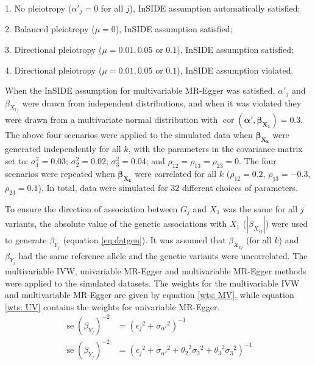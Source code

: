 \documentclass[a4paper,12pt]{article}
\DeclareMathOperator{\se}{se} %
\DeclareMathOperator{\cor}{cor}
\begin{document}
\begin{bibunit}[wileyj]
\begin{compactitem}
\item[1.] No pleiotropy ($\alpha'_{j}=0$ for all $j$), InSIDE assumption automatically satisfied;
\item[2.] Balanced pleiotropy ($\mu=0$), InSIDE assumption satisfied;
\item[3.] Directional pleiotropy ($\mu=0.01, 0.05$ or $0.1$), InSIDE assumption satisfied;
\item[4.] Directional pleiotropy ($\mu=0.01, 0.05$ or $0.1$), InSIDE assumption violated. \\
\end{compactitem}
When the InSIDE assumption for multivariable MR-Egger was satisfied, $\alpha'_{j}$ and $\beta_{X_{1j}}$ were drawn from independent distributions, and when it was violated they were drawn from a multivariate normal distribution with $\cor(\boldsymbol{\alpha'},\boldsymbol{\beta_{X_{1}}})=0.3$. The above four scenarios were applied to the simulated data when $\boldsymbol{\beta_{X_{k}}}$ were generated independently for all $k$, with the parameters in the covariance matrix set to: $\sigma_{1}^{2}=0.03$; $\sigma_{2}^{2}=0.02$; $\sigma_{3}^{2}=0.04$; and $\rho_{12}=\rho_{13}=\rho_{23}=0$. The four scenarios were repeated when $\boldsymbol{\beta_{X_{k}}}$ were correlated for all $k$ ($\rho_{12}=0.2$, $\rho_{13}=-0.3$, $\rho_{23}=0.1$). In total, data were simulated for 32 different choices of parameters.  

To ensure the direction of association between $G_{j}$ and $X_{1}$ was the same for all $j$ variants, the absolute value of the genetic associations with $X_{1}$ ($|\beta_{X_{1j}}|$) were used to generate $\beta_{Y_{j}}$ (equation \ref{eq:datgen}). It was assumed that $\beta_{X_{kj}}$ (for all $k$) and $\beta_{Y_{j}}$ had the same reference allele and the genetic variants were uncorrelated. The multivariable IVW, univariable MR-Egger and multivariable MR-Egger methods were applied to the simulated datasets.  The weights for the multivariable IVW and multivariable MR-Egger are given by equation \ref{wts: MV}, while equation \ref{wts: UV} contains the weights for univariable MR-Egger.
\begin{align}
\se(\beta_{Y_{j}})^{-2}&={({\epsilon_{j}}^{2}+{\sigma_{\alpha'}}^{2})}^{-1} \label{wts: MV} \\
\se(\beta_{Y_{j}})^{-2}&={({\epsilon_{j}}^{2}+{\sigma_{\alpha'}}^{2}+{\theta_{2}}^{2}{\sigma_{2}}^{2} + {\theta_{3}}^{2}{\sigma_{3}}^{2})}^{-1} \label{wts: UV}
\end{align}


\end{bibunit}
\end{document}
